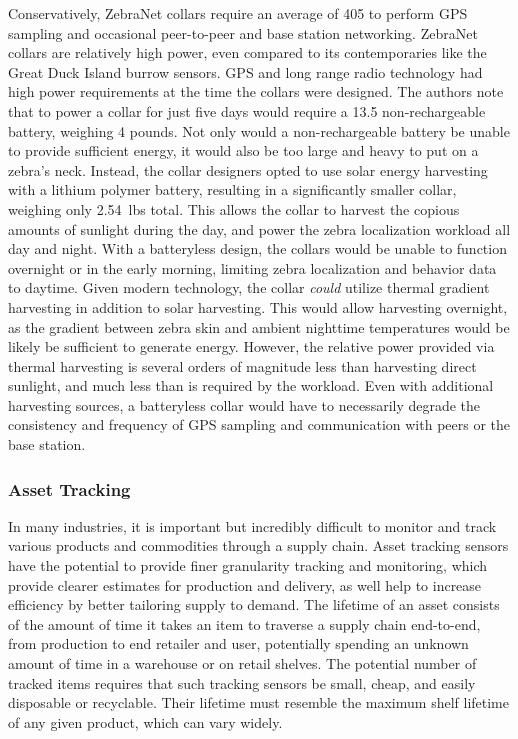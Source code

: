 Conservatively, ZebraNet collars require an average of 405\ssi{\milli\watt} to perform GPS sampling and occasional peer-to-peer and base station networking. ZebraNet collars are relatively high power, even compared to its contemporaries like the Great Duck Island burrow sensors.
GPS and long range radio technology had high power requirements at the time the collars were designed.
The authors note that to power a collar for just five days would require a 13.5\ssi{\ampere\hour} non-rechargeable battery, weighing 4 pounds. Not only would a non-rechargeable battery be unable to provide sufficient energy, it would also be too large and heavy to put on a zebra's neck.
Instead, the collar designers opted to use solar energy harvesting with a lithium polymer battery, resulting in a significantly smaller collar, weighing only 2.54~lbs total.
This allows the collar to harvest the copious amounts of sunlight during the day, and power the zebra localization workload all day and night.
With a batteryless design, the collars would be unable to function overnight or in the early morning, limiting zebra localization and behavior data to daytime.
Given modern technology, the collar \textit{could} utilize thermal gradient harvesting in addition to solar harvesting. This would allow harvesting overnight, as the gradient between zebra skin and ambient nighttime temperatures would be likely be sufficient to generate energy.
However, the relative power provided via thermal harvesting is several orders of magnitude less than harvesting direct sunlight, and much less than is required by the workload.
Even with additional harvesting sources, a batteryless collar would have to necessarily degrade the consistency and frequency of GPS sampling and communication with peers or the base station.

\subsubsection{Asset Tracking}
In many industries, it is important but incredibly difficult to monitor and track various products and commodities through a supply chain.
Asset tracking sensors have the potential to provide finer granularity tracking and monitoring, which provide clearer estimates for production and delivery, as well help to increase efficiency by better tailoring supply to demand.
The lifetime of an asset consists of the amount of time it takes an item to traverse a supply chain end-to-end, from production to end retailer and user, potentially spending an unknown amount of time in a warehouse or on retail shelves.
The potential number of tracked items requires that such tracking sensors be small, cheap, and easily disposable or recyclable. Their lifetime must resemble the maximum shelf lifetime of any given product, which can vary widely.

